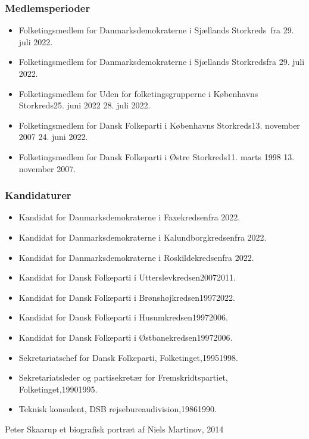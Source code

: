 \documentclass[11pt, a4paper]{awesome-cv}
\begin{document}
\begin{cvletter}
\subsubsection*{Medlemsperioder}
\begin{itemize}
\item Folketingsmedlem for Danmarksdemokraterne i Sjællands Storkreds fra 29. juli 2022.
\item Folketingsmedlem for Danmarksdemokraterne i Sjællands Storkredsfra 29. juli 2022.
\item Folketingsmedlem for Uden for folketingsgrupperne i Københavns Storkreds25. juni 2022  28. juli 2022.
\item Folketingsmedlem for Dansk Folkeparti i Københavns Storkreds13. november 2007  24. juni 2022.
\item Folketingsmedlem for Dansk Folkeparti i Østre Storkreds11. marts 1998  13. november 2007.
\end{itemize}
\subsubsection*{Kandidaturer}
\begin{itemize}
\item Kandidat for Danmarksdemokraterne i Faxekredsenfra 2022.
\item Kandidat for Danmarksdemokraterne i Kalundborgkredsenfra 2022.
\item Kandidat for Danmarksdemokraterne i Roskildekredsenfra 2022.
\item Kandidat for Dansk Folkeparti i Utterslevkredsen20072011.
\item Kandidat for Dansk Folkeparti i Brønshøjkredsen19972022.
\item Kandidat for Dansk Folkeparti i Husumkredsen19972006.
\item Kandidat for Dansk Folkeparti i Østbanekredsen19972006.
\end{itemize}
\begin{itemize}
\item Sekretariatschef for Dansk Folkeparti, Folketinget,19951998.
\item Sekretariatsleder og partisekretær for Fremskridtspartiet, Folketinget,19901995.
\item Teknisk konsulent, DSB rejsebureaudivision,19861990.
\end{itemize}
Peter Skaarup  et biografisk portræt af Niels Martinov, 2014

\end{cvletter}
\end{document}
